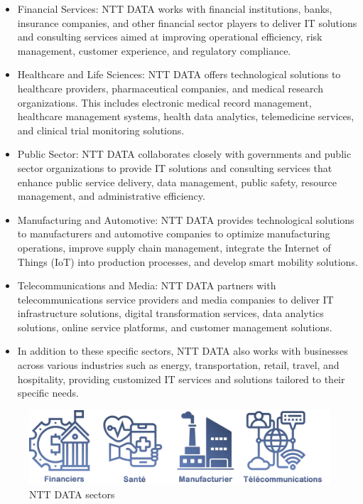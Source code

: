 \begin{itemize}
	\item Financial Services: NTT DATA works with financial institutions, banks, insurance companies, and other financial sector players to deliver IT solutions and consulting services aimed at improving operational efficiency, risk management, customer experience, and regulatory compliance.
	 
	\item Healthcare and Life Sciences: NTT DATA offers technological solutions to healthcare providers, pharmaceutical companies, and medical research organizations. This includes electronic medical record management, healthcare management systems, health data analytics, telemedicine services, and clinical trial monitoring solutions.
	
	\item Public Sector: NTT DATA collaborates closely with governments and public sector organizations to provide IT solutions and consulting services that enhance public service delivery, data management, public safety, resource management, and administrative efficiency.
	
	\item Manufacturing and Automotive: NTT DATA provides technological solutions to manufacturers and automotive companies to optimize manufacturing operations, improve supply chain management, integrate the Internet of Things (IoT) into production processes, and develop smart mobility solutions.
	
	\item Telecommunications and Media: NTT DATA partners with telecommunications service providers and media companies to deliver IT infrastructure solutions, digital transformation services, data analytics solutions, online service platforms, and customer management solutions.
	
	\item In addition to these specific sectors, NTT DATA also works with businesses across various industries such as energy, transportation, retail, travel, and hospitality, providing customized IT services and solutions tailored to their specific needs.
\end{itemize}

\begin{figure}[h!]
	\centering
	\includegraphics[width=0.8\linewidth]{Image/nttsector.png}
	\caption{NTT DATA sectors}
	\label{fig:NTT DATA sectors}
\end{figure}

